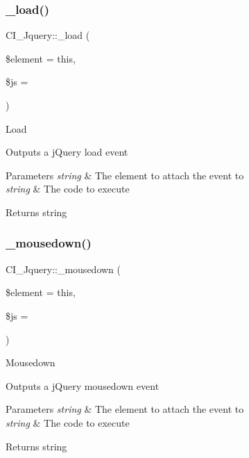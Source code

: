 \subsubsection{\texorpdfstring{\+\_\+load()}{\_load()}}
{\footnotesize\ttfamily C\+I\+\_\+\+Jquery\+::\+\_\+load (\begin{DoxyParamCaption}\item[{}]{\$element = {\ttfamily \textquotesingle{}this\textquotesingle{}},  }\item[{}]{\$js = {\ttfamily \textquotesingle{}\textquotesingle{}} }\end{DoxyParamCaption})\hspace{0.3cm}{\ttfamily [protected]}}

Load

Outputs a j\+Query load event


\begin{DoxyParams}{Parameters}
{\em string} & The element to attach the event to \\
\hline
{\em string} & The code to execute \\
\hline
\end{DoxyParams}
\begin{DoxyReturn}{Returns}
string 
\end{DoxyReturn}
\mbox{\label{class_c_i___jquery_a38a63d5e80047368cb0da3c753a935ad}} 
\subsubsection{\texorpdfstring{\+\_\+mousedown()}{\_mousedown()}}
{\footnotesize\ttfamily C\+I\+\_\+\+Jquery\+::\+\_\+mousedown (\begin{DoxyParamCaption}\item[{}]{\$element = {\ttfamily \textquotesingle{}this\textquotesingle{}},  }\item[{}]{\$js = {\ttfamily \textquotesingle{}\textquotesingle{}} }\end{DoxyParamCaption})\hspace{0.3cm}{\ttfamily [protected]}}

Mousedown

Outputs a j\+Query mousedown event


\begin{DoxyParams}{Parameters}
{\em string} & The element to attach the event to \\
\hline
{\em string} & The code to execute \\
\hline
\end{DoxyParams}
\begin{DoxyReturn}{Returns}
string 
\end{DoxyReturn}
\mbox{\label{class_c_i___jquery_aacdc8794c5bac47c91e9030b3f6a4a5d}} 

